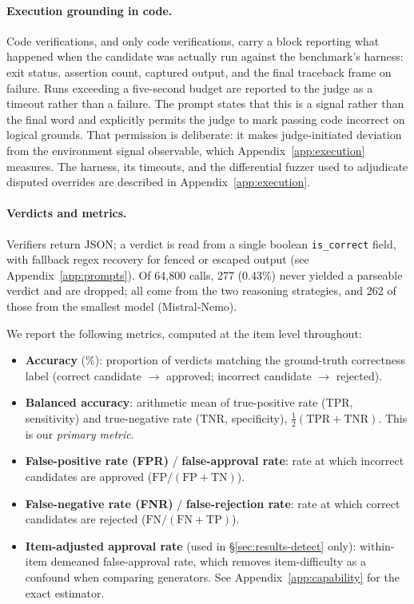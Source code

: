 \documentclass{article}
\begin{document}
\paragraph{Execution grounding in code.} Code verifications, and only code verifications,
carry a block reporting what happened when the candidate was actually run against the
benchmark's harness: exit status, assertion count, captured output, and the final traceback
frame on failure. Runs exceeding a five-second budget are reported to the judge as a
timeout rather than a failure. The prompt states that this is a signal rather than the final word and
explicitly permits the judge to mark passing code incorrect on logical grounds. That
permission is deliberate: it makes judge-initiated deviation from the environment signal observable, which Appendix~\ref{app:execution} measures. The harness, its timeouts, and the
differential fuzzer used to adjudicate disputed overrides are described in
Appendix~\ref{app:execution}.

\paragraph{Verdicts and metrics.}
Verifiers return JSON; a verdict is read from a single boolean \texttt{is\_correct}
field, with fallback regex recovery for fenced or escaped output
(see Appendix~\ref{app:prompts}). Of 64{,}800 calls, 277 (0.43\%) never yielded
a parseable verdict and are dropped; all come from the two reasoning strategies,
and 262 of those from the smallest model (Mistral-Nemo).

We report the following metrics, computed at the item level throughout:

\begin{itemize}[nosep]
  \item \textbf{Accuracy} (\%): proportion of verdicts matching the ground-truth
    correctness label (correct candidate $\to$ approved; incorrect candidate
    $\to$ rejected).
  \item \textbf{Balanced accuracy}: arithmetic mean of true-positive rate (TPR,
    sensitivity) and true-negative rate (TNR, specificity),
    $\tfrac{1}{2}(\mathrm{TPR}+\mathrm{TNR})$. This is our \emph{primary metric}.
  \item \textbf{False-positive rate (FPR)} / \textbf{false-approval rate}: rate
    at which incorrect candidates are approved ($\mathrm{FP}/(\mathrm{FP}+\mathrm{TN})$).
  \item \textbf{False-negative rate (FNR)} / \textbf{false-rejection rate}: rate
    at which correct candidates are rejected ($\mathrm{FN}/(\mathrm{FN}+\mathrm{TP})$).
  \item \textbf{Item-adjusted approval rate} (used in \S\ref{sec:results-detect}
    only): within-item demeaned false-approval rate, which removes item-difficulty
    as a confound when comparing generators. See Appendix~\ref{app:capability}
    for the exact estimator.
\end{itemize}
\end{document}
